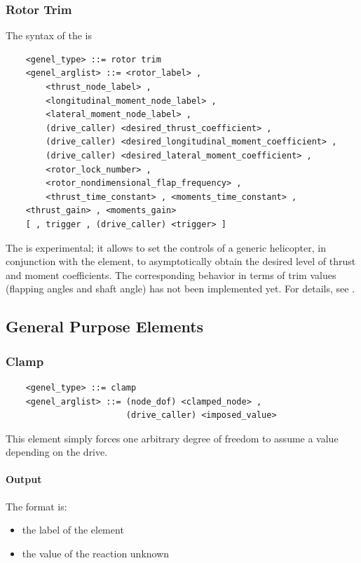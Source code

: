 \subsubsection{Rotor Trim}
The syntax of the  is
\begin{verbatim}
    <genel_type> ::= rotor trim
    <genel_arglist> ::= <rotor_label> ,
        <thrust_node_label> ,
        <longitudinal_moment_node_label> ,
        <lateral_moment_node_label> ,
        (drive_caller) <desired_thrust_coefficient> ,
        (drive_caller) <desired_longitudinal_moment_coefficient> ,
        (drive_caller) <desired_lateral_moment_coefficient> ,
        <rotor_lock_number> ,
        <rotor_nondimensional_flap_frequency> ,
        <thrust_time_constant> , <moments_time_constant> ,
	<thrust_gain> , <moments_gain>
	[ , trigger , (drive_caller) <trigger> ]
\end{verbatim}
The  is experimental; it allows to set the controls 
of a generic helicopter, in conjunction with the 
element, to asymptotically obtain the desired level of thrust and
moment coefficients.
The corresponding behavior in terms of trim values (flapping angles
and shaft angle) has not been implemented yet.
For details, see \cite{PETERS-TRIM90}.




\subsection{General Purpose Elements}
   
\subsubsection{Clamp}
\begin{verbatim}
    <genel_type> ::= clamp
    <genel_arglist> ::= (node_dof) <clamped_node> ,
                        (drive_caller) <imposed_value>
\end{verbatim}
This element simply forces one arbitrary degree of freedom to assume a value
depending on the drive.

\paragraph{Output}
The format is:
\begin{itemize}
    \item the label of the element
    \item the value of the reaction unknown
\end{itemize}
  
